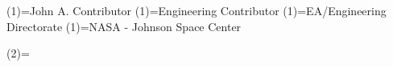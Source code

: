 \docContributorName(1)={John A. Contributor}
\docContributorPosition(1)={Engineering Contributor}
\docContributorOrganization(1)={EA/Engineering Directorate}
\docContributorLocation(1)={NASA - Johnson Space Center}

\docContributorName(2)={}